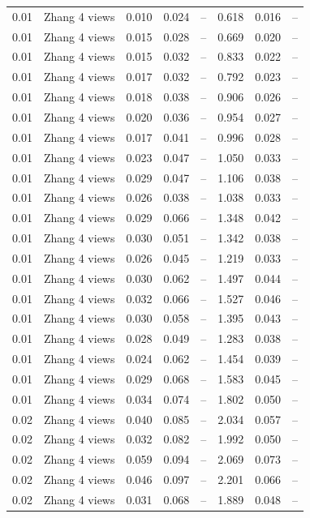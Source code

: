 \begin{table}[H]
\begin{tabular}{l c l l l}
0.01 & Zhang 4 views & 0.010 & 0.024 & -- & 0.618 & 0.016 & -- \\
0.01 & Zhang 4 views & 0.015 & 0.028 & -- & 0.669 & 0.020 & -- \\
0.01 & Zhang 4 views & 0.015 & 0.032 & -- & 0.833 & 0.022 & -- \\
0.01 & Zhang 4 views & 0.017 & 0.032 & -- & 0.792 & 0.023 & -- \\
0.01 & Zhang 4 views & 0.018 & 0.038 & -- & 0.906 & 0.026 & -- \\
0.01 & Zhang 4 views & 0.020 & 0.036 & -- & 0.954 & 0.027 & -- \\
0.01 & Zhang 4 views & 0.017 & 0.041 & -- & 0.996 & 0.028 & -- \\
0.01 & Zhang 4 views & 0.023 & 0.047 & -- & 1.050 & 0.033 & -- \\
0.01 & Zhang 4 views & 0.029 & 0.047 & -- & 1.106 & 0.038 & -- \\
0.01 & Zhang 4 views & 0.026 & 0.038 & -- & 1.038 & 0.033 & -- \\
0.01 & Zhang 4 views & 0.029 & 0.066 & -- & 1.348 & 0.042 & -- \\
0.01 & Zhang 4 views & 0.030 & 0.051 & -- & 1.342 & 0.038 & -- \\
0.01 & Zhang 4 views & 0.026 & 0.045 & -- & 1.219 & 0.033 & -- \\
0.01 & Zhang 4 views & 0.030 & 0.062 & -- & 1.497 & 0.044 & -- \\
0.01 & Zhang 4 views & 0.032 & 0.066 & -- & 1.527 & 0.046 & -- \\
0.01 & Zhang 4 views & 0.030 & 0.058 & -- & 1.395 & 0.043 & -- \\
0.01 & Zhang 4 views & 0.028 & 0.049 & -- & 1.283 & 0.038 & -- \\
0.01 & Zhang 4 views & 0.024 & 0.062 & -- & 1.454 & 0.039 & -- \\
0.01 & Zhang 4 views & 0.029 & 0.068 & -- & 1.583 & 0.045 & -- \\
0.01 & Zhang 4 views & 0.034 & 0.074 & -- & 1.802 & 0.050 & -- \\
0.02 & Zhang 4 views & 0.040 & 0.085 & -- & 2.034 & 0.057 & -- \\
0.02 & Zhang 4 views & 0.032 & 0.082 & -- & 1.992 & 0.050 & -- \\
0.02 & Zhang 4 views & 0.059 & 0.094 & -- & 2.069 & 0.073 & -- \\
0.02 & Zhang 4 views & 0.046 & 0.097 & -- & 2.201 & 0.066 & -- \\
0.02 & Zhang 4 views & 0.031 & 0.068 & -- & 1.889 & 0.048 & -- \\

\end{tabular}
\end{table}
